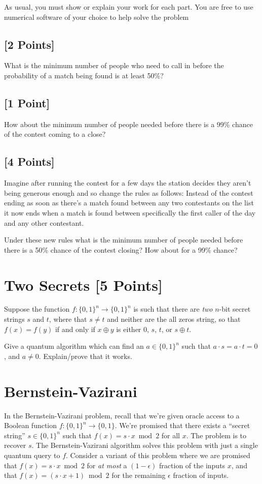 \documentclass[11pt]{article}
\begin{document}
As usual, you must show or explain your work for each part. You are free to use numerical software of your choice to help solve the problem

\subsection{[2 Points]}
What is the minimum number of people who need to call in before the probability of a match being found is at least 50\%?




\subsection{[1 Point]}
How about the minimum number of people needed before there is a 99\% chance of the contest coming to a close?




\subsection{[4 Points]}
Imagine after running the contest for a few days the station decides they aren't being generous enough and so change the rules as follows: Instead of the contest ending as soon as there's a match found between any two contestants on the list it now ends when a match is found between specifically the first caller of the day and any other contestant. 

Under these new rules what is the minimum number of people needed before there is a 50\% chance of the contest closing? How about for a 99\% chance?






\section{Two Secrets [5 Points]}
Suppose the function $f: \{0, 1\}^n \rightarrow \{0, 1\}^n$ is such that there are \textit{two} $n$-bit secret strings $s$ and $t$, where that $s\neq t$ and neither are the all zeros string, so that $f(x) = f(y)$ if and only if $x \oplus y$ is either $0$, $s$, $t$, or $s \oplus t$.

\noindent Give a quantum algorithm which can find an $a \in \{0, 1\}^n$ such that $a \cdot s = a \cdot t = 0$, and $a \neq 0$. Explain/prove that it works.
\section{Bernstein-Vazirani} In the Bernstein-Vazirani problem, recall that we're
given oracle access to a Boolean function $f\colon\{0,1\}^n\to\{0,1\}$. We're
promised that there exists a ``secret string'' $s \in \{0,1\}^n$ such that
$f(x)=s \cdot x \bmod{2}$ for all $x$. The problem is to recover $s$. The
Bernstein-Vazirani algorithm solves this problem with just a single quantum query
to $f$. Consider a variant of this problem where we are promised that $f(x) = s\cdot x \bmod{2}$ for \emph{at most} a $(1 - \epsilon)$ fraction of the inputs $x$,
and that $f(x) = (s\cdot x + 1) \bmod{2}$ for the remaining $\epsilon$ fraction of
inputs.
\end{document}

